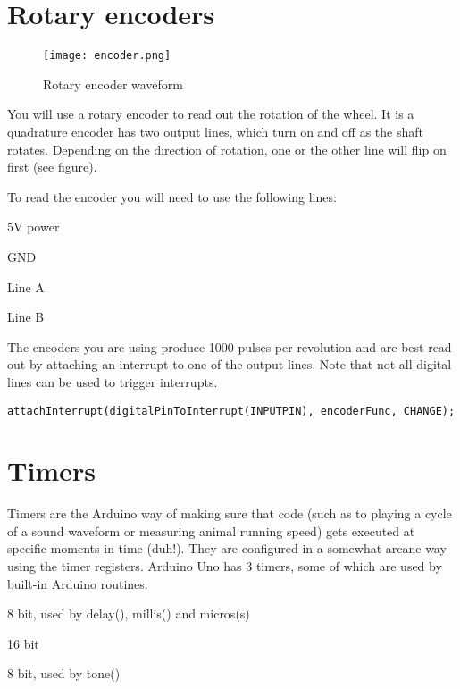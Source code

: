 \documentclass[a4paper,10pt]{article}
\begin{document}
\section{Rotary encoders}
\begin{figure}[here]
\texttt{[image: encoder.png]}
\caption{Rotary encoder waveform}
\end{figure}

You will use a rotary encoder to read out the rotation of the wheel. It is a quadrature encoder has 
two output lines, which turn on and off as the shaft rotates. Depending on the direction
of rotation, one or the other line will flip on first (see figure). 

To read the encoder you will need to use the following lines:

\begin{description}[align=right]
\item [BROWN] 5V power
\item [WHITE] GND
\item [GRAY] Line A
\item [GREEN] Line B
\end{description}

The encoders you are using produce 1000 pulses per revolution and are best read out by attaching
an interrupt to one of the output lines. Note that not all digital lines can be used to trigger
interrupts.	

\begin{lstlisting}
attachInterrupt(digitalPinToInterrupt(INPUTPIN), encoderFunc, CHANGE);
\end{lstlisting}

\section{Timers}
Timers are the Arduino way of making sure that code (such as to playing a cycle of a sound 
waveform or measuring animal running speed) gets executed at specific moments in time (duh!).
They are configured in a somewhat arcane way using the timer registers. Arduino Uno has 3 timers,
some of which are used by built-in Arduino routines.

\begin{description}[align=right]
\item [Timer0] 8 bit, used by delay(), millis() and micros(s)
\item [Timer1] 16 bit
\item [Timer2] 8 bit, used by tone()
\end{description}
\end{document}

